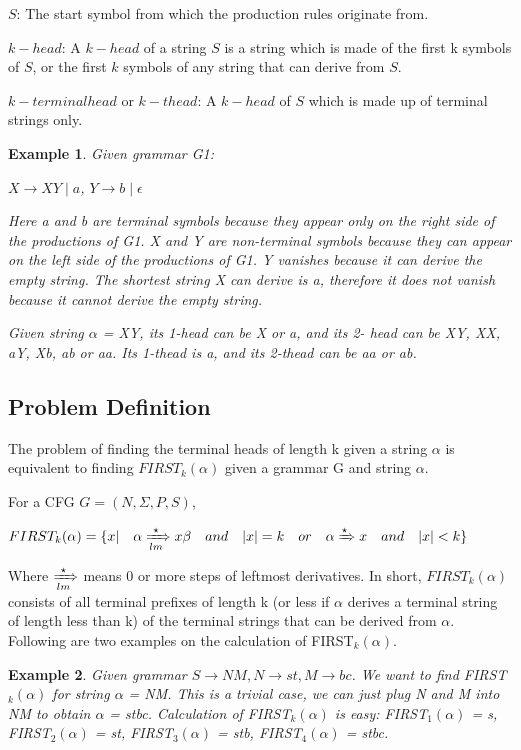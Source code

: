 \documentclass{sig-alternate-05-2015}
\newtheorem{SampleEnv}{Example}[section]
\begin{document}
$S$: The start symbol from which the production rules originate from.

$k-head$: A $k-head$ of a string $S$ is a string which is made of the
first k symbols of $S$, or the first $k$ symbols of any string
that can derive from $S$. 

$k-terminal head$ or $k-thead$: A $k-head$ of $S$ which is made up of terminal strings only.


\begin{SampleEnv}

Given grammar G1: 

$X\rightarrow XY \mid a$, $Y\rightarrow b\mid \epsilon$

Here a and b are terminal symbols because they appear
only on the right side of the productions of G1. X and Y are
non-terminal symbols because they can appear on the left
side of the productions of G1.
Y vanishes because it can derive the empty string. The
shortest string X can derive is a, therefore it does not vanish
because it cannot derive the empty string.

Given string $\alpha$ = XY, its 1-head can be X or a, and its 2-
head can be XY, XX, aY, Xb, ab or aa. Its 1-thead is a, and
its 2-thead can be aa or ab.
\end{SampleEnv}


\subsection{Problem Definition}
The problem of finding the terminal heads of length k given a string $\alpha$ is equivalent to finding $FIRST_k(\alpha)$ given a grammar G and string $\alpha$.

For a CFG $G = (N, \Sigma, P, S)$,

$FIRST_k(\alpha) = \{x|\quad \alpha \xRightarrow[lm]{\star} x\beta \quad and \quad |x|=k \quad or \quad \alpha \xRightarrow{\star} x \quad and \quad |x|<k \}$

Where $\xRightarrow[lm]{\star}$ means 0 or more steps of leftmost derivatives.
In short, $FIRST_k(\alpha)$ consists of all terminal prefixes of length k (or less if $\alpha$ derives a terminal string of length less than k) of the terminal strings that can be derived from $\alpha$.
Following are two examples on the calculation of FIRST$_k(\alpha)$.



\begin{SampleEnv}
Given grammar $S\rightarrow NM, N\rightarrow st, M\rightarrow bc$.
We want to find FIRST$_k(\alpha)$ for string $\alpha$ = NM. This is a
trivial case, we can just plug N and M into NM to obtain $\alpha$
= stbc. Calculation of FIRST$_k(\alpha)$ is easy: FIRST$_1(\alpha)$ = {s},
FIRST$_2(\alpha)$ = {st}, FIRST$_3(\alpha)$ = {stb}, FIRST$_4(\alpha)$ = {stbc}.
\end{SampleEnv}
\end{document}
